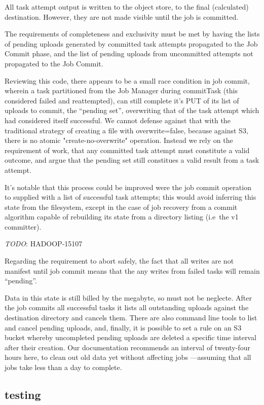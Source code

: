 \documentclass[conference]{IEEEtran}
\newcommand{\TODO}{\emph{TODO}}
\begin{document}
All task attempt output is written to the object store, to the final (calculated)
destination.
However, they are not made visible until the job is committed.

The requirements of completeness and exclusivity must be met by
having the lists of pending uploads generated by committed task attempts propagated
to the Job Commit phase, and the list of pending uploads from uncommitted
attempts not propagated to the Job Commit.


Reviewing this code, there appears to be a small race condition in job commit,
wherein a task partitioned from the Job Manager during commitTask
(this considered failed and reattempted),
can still complete it's PUT of its list of uploads to commit, the ``pending set'',
overwriting that of the task attempt which had considered itself successful.
We cannot defense against that with the traditional strategy of creating
a file with overwrite=false, because against S3, there is no atomic
"create-no-overwrite" operation.
Instead we rely on the requirement of work, that any committed task attempt must
constitute a valid outcome, and argue that the pending set still constitues a valid
result from a task attempt.

It's notable that this process could be improved were the job commit
operation to supplied with a list of successful task attempts;
this would avoid inferring this state from the filesystem, except in
the case of job recovery from a commit algorithm capable of
rebuilding its state from a directory listing (i.e\ the v1 committer).


\TODO: HADOOP-15107

Regarding the requirement to abort safely, the fact that all writes are
not manifest until job commit means that the any writes from failed tasks
will remain ``pending''.

Data in this state is still billed by the megabyte, so must not be neglecte.
After the job commits all successful tasks it lists all outstanding
uploads against the destination directory and cancels them.
There are also command line tools to list and cancel pending uploads,
and, finally, it is possible to set a rule on an S3 bucket whereby uncompleted
pending uploads are deleted a specific time interval after their creation.
Our documentation recommends an interval of twenty-four hours here, to
clean out old data yet without affecting jobs ---assuming that all jobs
take less than a day to complete.


\subsection{testing}\label{subsec:testing}
\end{document}
